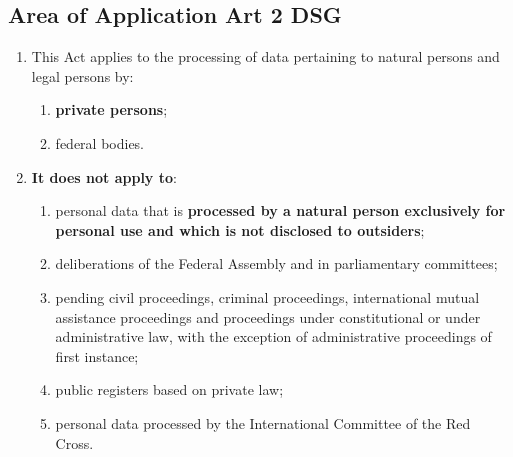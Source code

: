 \documentclass[11pt]{article}
\theoremstyle{definition}
\begin{document}
\subsection{Area of Application Art 2 DSG}
\begin{enumerate}[label=\arabic*]
	\item This Act applies to the processing of data pertaining to natural persons and legal persons by:
	\begin{enumerate}[label=\alph*.]
		\item \textbf{private persons};
		\item federal bodies.
	\end{enumerate}
	\item \textbf{It does not apply to}:
	\begin{enumerate}[label=\alph*.]
		\item personal data that is \textbf{processed by a natural person exclusively for personal use and which is not disclosed to outsiders};
		\item deliberations of the Federal Assembly and in parliamentary committees;
		\item pending civil proceedings, criminal proceedings, international mutual assistance proceedings and proceedings under constitutional or under administrative law, with the exception of administrative proceedings of first instance;
		\item public registers based on private law;
		\item personal data processed by the International Committee of the Red Cross.
	\end{enumerate}
\end{enumerate}
\end{document}
